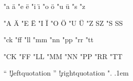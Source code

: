 
\let\normaldoublequote="

\startlanguagespecifics[\s!de]

  \installcompoundcharacter "a {\moveaccent{-.1ex}\"a\midworddiscretionary}
  \installcompoundcharacter "e {\moveaccent{-.1ex}\"e\midworddiscretionary}
  \installcompoundcharacter "i {\moveaccent{-.1ex}\"\i\midworddiscretionary}
  \installcompoundcharacter "o {\moveaccent{-.1ex}\"o\midworddiscretionary}
  \installcompoundcharacter "u {\moveaccent{-.1ex}\"u\midworddiscretionary}
  \installcompoundcharacter "s {\SS}
  \installcompoundcharacter "z {\SS}

  \installcompoundcharacter "A {\smashaccent\"A}
  \installcompoundcharacter "E {\smashaccent\"E}
  \installcompoundcharacter "I {\smashaccent\"I}
  \installcompoundcharacter "O {\smashaccent\"O}
  \installcompoundcharacter "U {\smashaccent\"U}
  \installcompoundcharacter "Z {SZ}
  \installcompoundcharacter "S {SS}

\stoplanguagespecifics

\startlanguagespecifics[\s!de]

  \installcompoundcharacter "ck {}
  \installcompoundcharacter "ff {}
  \installcompoundcharacter "ll {}
  \installcompoundcharacter "mm {}
  \installcompoundcharacter "nn {}
  \installcompoundcharacter "pp {}
  \installcompoundcharacter "rr {}
  \installcompoundcharacter "tt {}

  \installcompoundcharacter "CK {}
  \installcompoundcharacter "FF {}
  \installcompoundcharacter "LL {}
  \installcompoundcharacter "MM {}
  \installcompoundcharacter "NN {}
  \installcompoundcharacter "PP {}
  \installcompoundcharacter "RR {}
  \installcompoundcharacter "TT {}

\stoplanguagespecifics

\startlanguagespecifics[\s!de]

  \installcompoundcharacter "` {\handlequotation\c!leftquotation}
  \installcompoundcharacter "' {\handlequotation\c!rightquotation}
  \installcompoundcharacter ". {\kern.1em\ignorespaces}

